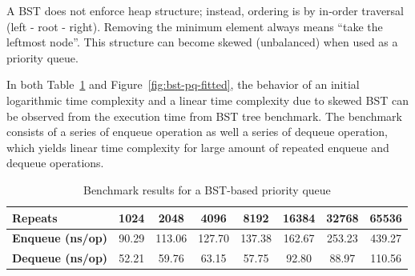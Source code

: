 \documentclass[a4paper,11pt]{article}
\begin{document}
A BST does not enforce heap structure; instead, ordering is by in‑order traversal (left - root - right). Removing the minimum element always means “take the leftmost node”. This structure can become skewed (unbalanced) when used as a priority queue.

In both Table~\ref{tab:bst-pq-transposed} and Figure~\ref{fig:bst-pq-fitted}, the behavior of an initial logarithmic time complexity and a linear time complexity due to skewed BST can be observed from the execution time from BST tree benchmark. The benchmark consists of a series of enqueue operation as well a series of dequeue operation, which yields linear time complexity for large amount of repeated enqueue and dequeue operations.

\begin{table}[h]
\centering
\begin{tabular}{l|ccccccc}
\textbf{Repeats}
    & 1024 & 2048 & 4096 & 8192 & 16384 & 32768 & 65536 \\
\hline
\textbf{Enqueue (ns/op)}
    & 90.29 & 113.06 & 127.70 & 137.38 & 162.67 & 253.23 & 439.27 \\
\textbf{Dequeue (ns/op)}
    & 52.21 & 59.76 & 63.15 & 57.75 & 92.80 & 88.97 & 110.56 \\
\end{tabular}
\caption{Benchmark results for a BST-based priority queue}
\label{tab:bst-pq-transposed}
\end{table}
\end{document}
